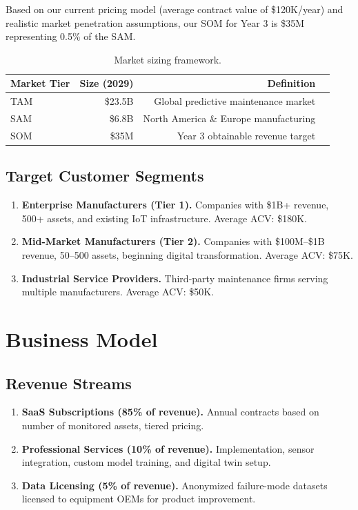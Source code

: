 \documentclass[
    language=english,
    doctype=business-plan,
    institution=none,
]{../../omnilatex}
\begin{document}
Based on our current pricing model (average contract value of \$120K/year) and
realistic market penetration assumptions, our SOM for Year 3 is \$35M
representing 0.5\% of the SAM.

\begin{table}[h]
    \centering
    \begin{tabular}{lrrr}
        \toprule
        \textbf{Market Tier} & \textbf{Size (2029)} & \textbf{Definition} \\
        \midrule
        TAM & \$23.5B & Global predictive maintenance market \\
        SAM & \$6.8B  & North America \& Europe manufacturing \\
        SOM & \$35M   & Year 3 obtainable revenue target \\
        \bottomrule
    \end{tabular}
    \caption{Market sizing framework.}
\end{table}

\subsection{Target Customer Segments}

\begin{enumerate}
    \item \textbf{Enterprise Manufacturers (Tier 1).} Companies with
        \$1B+ revenue, 500+ assets, and existing IoT infrastructure.
        Average ACV: \$180K.
    \item \textbf{Mid-Market Manufacturers (Tier 2).} Companies with
        \$100M--\$1B revenue, 50--500 assets, beginning digital
        transformation. Average ACV: \$75K.
    \item \textbf{Industrial Service Providers.} Third-party maintenance
        firms serving multiple manufacturers. Average ACV: \$50K.
\end{enumerate}

\section{Business Model}

\subsection{Revenue Streams}

\begin{enumerate}
    \item \textbf{SaaS Subscriptions (85\% of revenue).} Annual contracts
        based on number of monitored assets, tiered pricing.
    \item \textbf{Professional Services (10\% of revenue).} Implementation,
        sensor integration, custom model training, and digital twin setup.
    \item \textbf{Data Licensing (5\% of revenue).} Anonymized failure-mode
        datasets licensed to equipment OEMs for product improvement.
\end{enumerate}
\end{document}
